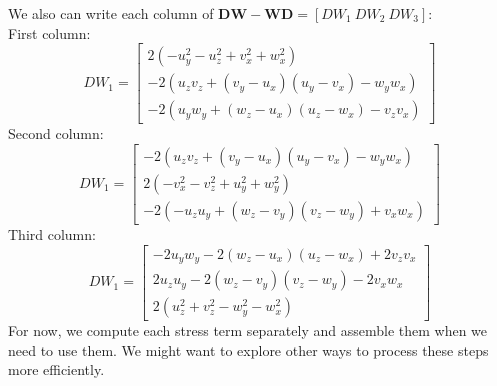 We also can write each column of ${\bm{DW}} - {\bm{WD}} = \left[ DW_1 \ DW_2 \ DW_3  \right]$:
\\
First column:
\[
DW_1 = 
\begin{bmatrix}
    2 \left(- u_{y}^2-u_{z}^2  + v_{x}^2 + w_{x}^2\right)
    \\
    -2 \left(u_{z} v_{z}+\left(v_{y}-u_{x}\right) \left(u_{y}-v_{x}\right)-w_{y} w_{x}\right)
    \\
    -2 
    \left(
    u_{y} w_{y}+ \left(w_{z}-u_{x}\right) \left(u_{z}-w_{x}\right)- v_{z} v_{x}
    \right)
\end{bmatrix}
\]
Second column:
\[
DW_1 = 
\begin{bmatrix}
    -2 \left(u_{z} v_{z}+\left(v_{y}-u_{x}\right) \left(u_{y}-v_{x}\right)-w_{y} w_{x}\right)
    \\
    2 \left(- v_{x}^2 - v_{z}^2 +u_{y}^2 + w_{y}^2\right)
    \\
    -2 
    \left(
    -u_{z} u_{y}+ \left(w_{z}-v_{y}\right) \left(v_{z}-w_{y}\right)+ v_{x} w_{x}
    \right)
\end{bmatrix}
\]
Third column:
\[
DW_1 = 
\begin{bmatrix}
   -2 u_{y} w_{y}-2 \left(w_{z}-u_{x}\right) \left(u_{z}-w_{x}\right)+2 v_{z} v_{x}
   \\
   2 u_{z} u_{y}-2 \left(w_{z}-v_{y}\right) \left(v_{z}-w_{y}\right)-2 v_{x} w_{x}
   \\
   2 \left(u_{z}^2+v_{z}^2-w_{y}^2-w_{x}^2\right)
\end{bmatrix}
\]
For now, we compute each stress term separately and assemble them when we need to use them. We might want to explore other ways to process these steps more efficiently. 
